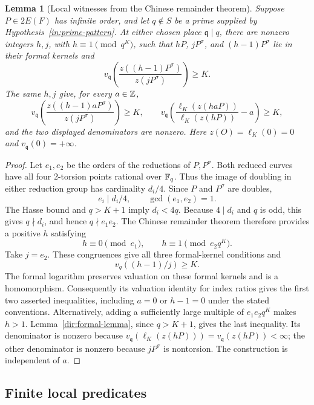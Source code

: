 \documentclass[11pt]{article}
\newtheorem{lemma}[theorem]{Lemma}
\theoremstyle{definition}\newtheorem{inputthm}[theorem]{Hypothesis}
\theoremstyle{remark}\newtheorem{remark}[theorem]{Remark}
\begin{document}
\begin{lemma}[Local witnesses from the Chinese remainder theorem]
\label{lem:prime-crt}
Suppose $P\in2E(F)$ has infinite order, and let $q\notin S$ be a prime
supplied by Hypothesis~\ref{in:prime-pattern}. At either chosen
place $\mathfrak q\mid q$, there are nonzero integers $h,j$, with
$h\equiv1\pmod{q^K}$, such that $hP$, $jP^\sigma$, and
$(h-1)P^\sigma$ lie in their formal kernels and
\[
 v_{\mathfrak q}\!\left(
       \frac{z((h-1)P^\sigma)}{z(jP^\sigma)}\right)\ge K.
\]
The same $h,j$ give, for every $a\in\mathbb Z$,
\[
 v_{\mathfrak q}\!\left(
       \frac{z((h-1)aP^\sigma)}{z(jP^\sigma)}\right)\ge K,
 \qquad
 v_{\mathfrak q}\!\left(
       \frac{\ell_K(z(haP))}{\ell_K(z(hP))}-a\right)\ge K,
\]
and the two displayed denominators are nonzero. Here
$z(O)=\ell_K(0)=0$ and $v_{\mathfrak q}(0)=+\infty$.
\end{lemma}
\begin{proof}
Let $e_1,e_2$ be the orders of the reductions of $P,P^\sigma$.
Both reduced curves have all four $2$-torsion points rational over
$\mathbb F_q$. Thus the image of doubling in either reduction group has
cardinality $d_i/4$. Since $P$ and $P^\sigma$ are doubles,
\[
                         e_i\mid d_i/4,
             \qquad\gcd(e_1,e_2)=1.
\]
The Hasse bound \cite[Theorem~V.1.1]{Silverman} and $q>K+1$ imply $d_i<4q$.
Because $4\mid d_i$ and $q$ is odd, this gives $q\nmid d_i$,
and hence $q\nmid e_1e_2$. The Chinese remainder theorem therefore
provides a positive $h$ satisfying
\[
                h\equiv0\pmod{e_1},\qquad
                h\equiv1\pmod{e_2q^K}.
\]
Take $j=e_2$. These congruences give all three formal-kernel
conditions and
\[
                           v_q((h-1)/j)\ge K.
\]
The formal logarithm preserves valuation on these formal kernels
and is a homomorphism. Consequently its valuation identity for
index ratios gives the first two asserted inequalities, including
$a=0$ or $h-1=0$ under the stated conventions. Alternatively,
adding a sufficiently large multiple of $e_1e_2q^K$ makes $h>1$.
Lemma~\ref{dir:formal-lemma}, since $q>K+1$, gives the last
inequality. Its denominator is nonzero because
$v_{\mathfrak q}(\ell_K(z(hP)))=v_{\mathfrak q}(z(hP))<\infty$;
the other denominator is nonzero because $jP^\sigma$ is
nontorsion. The construction is independent of $a$.
\end{proof}


\subsection{Finite local predicates}
\end{document}

